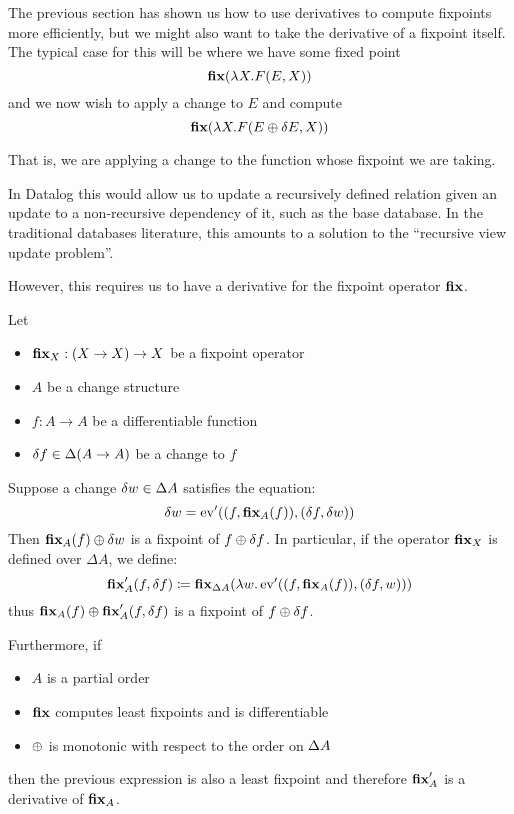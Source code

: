 The previous section has shown us how to use derivatives to compute fixpoints
more efficiently, but we might also want to take the derivative of a fixpoint
itself. The typical case for this will be where we have some fixed point
$$\textbf{fix} (\lambda X . F(E, X))$$
and we now wish to apply a change to $E$ and compute
$$\textbf{fix} (\lambda X . F(E \oplus \delta E, X))$$

That is, we are applying a change to the function whose fixpoint we are taking.

In Datalog this would allow us to update a recursively defined relation given an
update to a non-recursive dependency of it, such as the base database. In the
traditional databases literature, this amounts to a solution to the ``recursive
view update problem''.

However, this requires us to have a derivative for the fixpoint operator $\textbf{fix}$.

\begin{thm}
\label{thm:fixpointDiff}
  Let 
  \begin{itemize}
    \item$\textbf{fix}_X : (X \rightarrow X) \rightarrow X$ be a fixpoint operator
    \item $A$ be a change structure
    \item $f: A \rightarrow A$ be a differentiable function
    \item $\delta f \in \Delta (A \rightarrow A)$ be a change to $f$
  \end{itemize}

  Suppose a change $\delta w \in \Delta A$ satisfies
  the equation:
  \begin{equation}\label{eqn:fixcondition}
    \delta w = \operatorname{ev}'((f, \textbf{fix}_A(f)), (\delta f, \delta w))
  \end{equation}
  Then $\textbf{fix}_A(f) \oplus \delta w$ is a fixpoint of $f \oplus \delta f$. In particular,
  if the operator $\textbf{fix}_X$ is defined over $\Delta A$, we define:
  $$
  \textbf{fix}_A'(f, \delta f) \coloneqq
  \textbf{fix}_{\Delta A}(
    \lambda w .
      \operatorname{ev}'((f, \textbf{fix}_A(f)), (\delta f, w))
  )
  $$
  thus $\textbf{fix}_A(f) \oplus \textbf{fix}_A'(f, \delta f)$ is a fixpoint of $f \oplus \delta f$.

  Furthermore, if
  \begin{itemize}
    \item $A$ is a partial order
    \item $\textbf{fix}$ computes least fixpoints and is differentiable
    \item $\oplus$ is monotonic with respect to the order on $\Delta A$
  \end{itemize}
  then the previous expression is also a least fixpoint and therefore $\textbf{fix}_A'$
  is a derivative of $\textbf{fix}_A$.
\end{thm}

